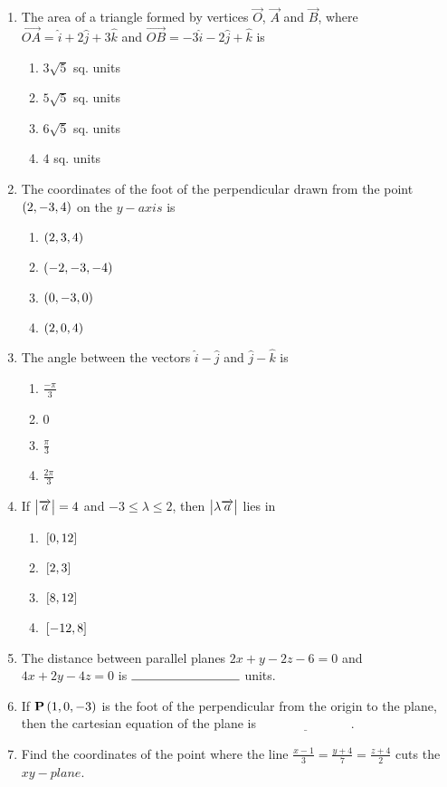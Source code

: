 
\begin{enumerate}
\item The area of a triangle formed by vertices $\vec{O}$, $\vec{A}$ and $\vec{B}$, where $\overrightarrow{OA}= \hat{i}+2 \hat{j}+3\hat{k}$ and $\overrightarrow{OB}= -3\hat{i} - 2\hat{j} + \hat{k}$ is
\begin{enumerate}
\item $3\sqrt{5}$ sq. units
\item $5\sqrt{5}$ sq. units
\item $6\sqrt{5}$ sq. units
\item $4$ sq. units
\end{enumerate}
\item The coordinates of the foot of the perpendicular drawn from the point $\left(2,-3,4\right)$ on the $y-axis$ is
\begin{enumerate}
\item $\left(2, 3, 4\right)$
\item $\left(-2,-3,-4\right)$
\item $\left(0,-3, 0\right)$
\item $\left(2, 0,4\right)$
\end{enumerate}
\item The angle between the vectors $\hat{i} - \hat{j}$ and $\hat{j} - \hat{k}$ is
\begin{enumerate}
\item $\frac{-\pi}{3}$
\item $0$
\item $\frac{\pi}{3}$
\item $\frac{2\pi}{3}$
\end{enumerate}
\item If $\begin{vmatrix}\overrightarrow{a}\end{vmatrix}= 4$ and $-3 \leq \lambda \leq 2$, then $\begin{vmatrix}\lambda \overrightarrow a\end{vmatrix}$ lies in
\begin{enumerate}
\item ${}\left[0,12\right]$
\item ${}\left[2,3\right]$
\item ${}\left[8,12\right]$
\item ${}\left[-12,8\right]$
\end{enumerate}
\item The distance between parallel planes $2x + y - 2z - 6 = 0$ and $4x + 2y - 4z = 0$ is $\rule{3cm}{0.15mm}$ units.
\item If $\mathbf{P}\left(1,  0, -3\right)$ is the foot of the perpendicular from the origin to the plane, then the cartesian equation of the plane is $\underline{\hspace{3cm}}$.
\item Find the coordinates of the point where the line $\frac{x-1}{3} = \frac{y+4}{7} = \frac{z+4}{2}$ cuts the $xy-plane$.

\end{enumerate}
